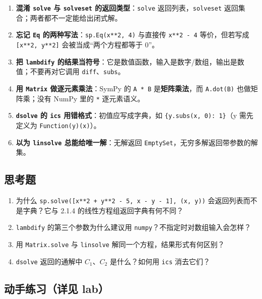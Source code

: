 \begin{enumerate}
\def\labelenumi{\arabic{enumi}.}
\tightlist
\item
  \textbf{混淆 \texttt{solve} 与 \texttt{solveset}
  的返回类型}：\texttt{solve} 返回列表，\texttt{solveset}
  返回集合；两者都不一定能给出闭式解。
\item
  \textbf{忘记 \texttt{Eq} 的两种写法}：\texttt{sp.Eq(x**2,\ 4)}
  与直接传 \texttt{x**2\ -\ 4} 等价，但若写成 \texttt{{[}x**2,\ y**2{]}}
  会被当成``两个方程都等于 0''。
\item
  \textbf{把 \texttt{lambdify}
  的结果当符号}：它是数值函数，输入是数字/数组，输出是数值；不要再对它调用
  \texttt{diff}、\texttt{subs}。
\item
  \textbf{用 \texttt{Matrix} 做逐元素乘法}：SymPy 的 \texttt{A\ *\ B}
  是\textbf{矩阵乘法}，而 \texttt{A.dot(B)} 也做矩阵乘；没有 NumPy 里的
  \texttt{*} 逐元素语义。
\item
  \textbf{\texttt{dsolve} 的 \texttt{ics} 用错格式}：初值应写成字典，如
  \texttt{\{y.subs(x,\ 0):\ 1\}}（y 需先定义为
  \texttt{Function(\textquotesingle{}y\textquotesingle{})(x)}）。
\item
  \textbf{以为 \texttt{linsolve} 总能给唯一解}：无解返回
  \texttt{EmptySet}，无穷多解返回带参数的解集。
\end{enumerate}

\subsection{思考题}\label{ux601dux8003ux9898-8}

\begin{enumerate}
\def\labelenumi{\arabic{enumi}.}
\tightlist
\item
  为什么
  \texttt{sp.solve({[}x**2\ +\ y**2\ -\ 5,\ x\ -\ y\ -\ 1{]},\ (x,\ y))}
  会返回列表而不是字典？它与 2.1.4 的线性方程组返回字典有何不同？
\item
  \texttt{lambdify} 的第三个参数为什么建议用
  \texttt{\textquotesingle{}numpy\textquotesingle{}}？不指定时对数组输入会怎样？
\item
  用 \texttt{Matrix.solve} 与 \texttt{linsolve}
  解同一个方程，结果形式有何区别？
\item
  \texttt{dsolve} 返回的通解中 \(C_1\)、\(C_2\) 是什么？如何用
  \texttt{ics} 消去它们？
\end{enumerate}

\subsection{动手练习（详见
lab）}\label{ux52a8ux624bux7ec3ux4e60ux8be6ux89c1-lab-5}

